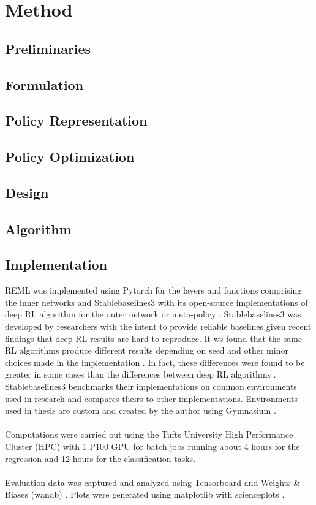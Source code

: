 \chapter{Method}
\label{Method}
\minitoc 

\section{Preliminaries}
\section{Formulation}
\section{Policy Representation}
\section{Policy Optimization}
\section{Design}
\section{Algorithm}
\section{Implementation}
REML was implemented using Pytorch for the layers and functions comprising the 
inner networks and Stablebaselines3 with its open-source implementations of deep RL 
algorithm for the outer network or meta-policy \cite{pytorch, RafHilGleKanErnDor:21}. 
Stablebaselines3 was developed by researchers with the intent to 
provide reliable baselines given recent findings that deep RL results are hard to 
reproduce. It ws found that the same RL algorithms produce different results depending 
on seed and other minor choices made in the implementation \cite{HenIslBacPinPreMeg:18}. 
In fact, these differences were found to be greater in some cases than the differences between
deep RL algorithms \cite{EngIlySanTsi:20}. Stablebaselines3 benchmarks their implementations
on common environments used in research and compares theirs to other implementations. 
Environments used in thesis are custom and created by the author using Gymnasium \cite{gymnasium}.
\\\\
Computations were carried out using the Tufts University High Performance Cluster (HPC) 
with 1 P100 GPU for batch jobs running about 4 hours for the regression and 12
hours for the classification tasks.
\\\\
Evaluation data was captured and analyzed using Tensorboard and Weights \& Biases (wandb)
\cite{tensorflow2015-whitepaper, wandb}. Plots were generated using matplotlib with 
scienceplots \cite{mmatplotlib SciencePlots}.


